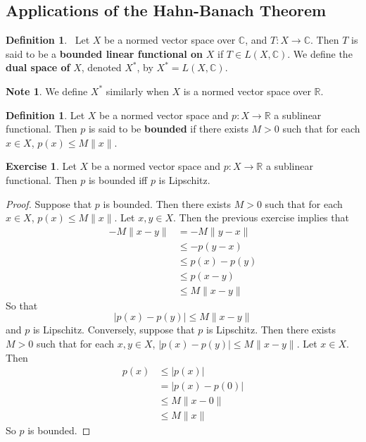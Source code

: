\documentclass[12pt]{amsart}
\theoremstyle{definition}
\newtheorem{defn}[definition]{Definition}
\newtheorem{note}[definition]{Note}
\newtheorem{ex}[definition]{Exercise}
\newcommand{\C}{\mathbb{C}}
\newcommand{\R}{\mathbb{R}}
\newcommand{\tbf}[1]{\textbf{#1}}
\DeclareMathOperator*{\0}{\mbf{0}}
\DeclareMathOperator*{\1}{\mbf{1}}
\newcommand{\lex}[1]{\label{ex:#1}}
\newcommand{\ld}[1]{\label{defn:#1}}
\begin{document}
	
	
	
	
	
	
	

	

	\newpage
	\subsection{Applications of the Hahn-Banach Theorem}
	
	
	
	
	
	
	\begin{defn} \ld{55002}\
	Let $X$ be a normed vector space over $\C$, and $T :X \rightarrow \C$. Then $T$ is said to be a \tbf{bounded linear functional on} $X$ if $T \in L(X, \C)$. We define the \tbf{dual space of} $X$, denoted $X^*$, by $X^* = L(X, \C)$.
	\end{defn}
	
	\begin{note}
	We define $X^*$ similarly when $X$ is a normed vector space over $\R$.
	\end{note}

	\begin{defn} \ld{55009}
		Let $X$ be a normed vector space and $p:X \rightarrow \R$ a sublinear functional. Then $p$ is said to be \tbf{bounded} if there exists $M >0$ such that for each $x \in X$, $p(x) \leq M\|x\|$. 
	\end{defn}
	
	\begin{ex} \lex{55010}
		Let $X$ be a normed vector space and $p:X \rightarrow \R$ a sublinear functional. Then $p$ is bounded iff $p$ is Lipschitz. 
	\end{ex}
	
	\begin{proof}
		Suppose that $p$ is bounded. Then there exists $M >0$ such that for each $x \in X$, $p(x) \leq M\|x\|$. Let $x, y \in X$. Then the previous exercise implies that 
		\begin{align*}
			-M\|x-y\| 
			&= -M\|y-x\| \\
			& \leq -p(y-x) \\
			& \leq p(x)-p(y) \\
			& \leq p(x-y) \\
			& \leq M \| x-y\| 
		\end{align*}
		So that $$|p(x) - p(y)| \leq  M\|x-y\|$$
		and $p$ is Lipschitz.
		Conversely, suppose that $p$ is Lipschitz. Then there exists $M >0 $ such that for each $x ,y \in X$, $|p(x) - p(y)| \leq  M\|x-y\|$. Let $x \in X$. Then 
		\begin{align*}
			p(x) 
			& \leq |p(x)| \\
			& = |p(x) - p(0)| \\
			& \leq M\|x - 0\| \\
			& \leq M\|x\| 
		\end{align*}
		So $p$ is bounded.
	\end{proof}
	
\end{document}
